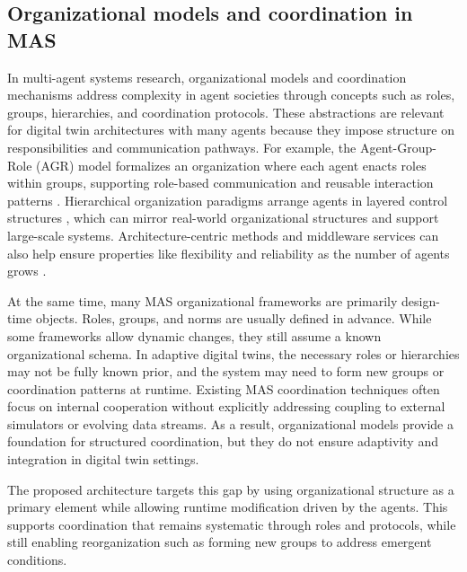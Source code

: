 \subsection{Organizational models and coordination in MAS}
In multi-agent systems research, organizational models and coordination mechanisms address complexity in agent societies through concepts such as roles, groups, hierarchies, and coordination protocols. These abstractions are relevant for digital twin architectures with many agents because they impose structure on responsibilities and communication pathways. For example, the Agent-Group-Role (AGR) model formalizes an organization where each agent enacts roles within groups, supporting role-based communication and reusable interaction patterns \cite{ferber2003organizational_view}. Hierarchical organization paradigms arrange agents in layered control structures \cite{horling2004survey_org_paradigms}, which can mirror real-world organizational structures and support large-scale systems. Architecture-centric methods and middleware services can also help ensure properties like flexibility and reliability as the number of agents grows \cite{weyns2010architecture}.

At the same time, many MAS organizational frameworks are primarily design-time objects. Roles, groups, and norms are usually defined in advance. While some frameworks allow dynamic changes, they still assume a known organizational schema. In adaptive digital twins, the necessary roles or hierarchies may not be fully known prior, and the system may need to form new groups or coordination patterns at runtime. Existing MAS coordination techniques often focus on internal cooperation without explicitly addressing coupling to external simulators or evolving data streams. As a result, organizational models provide a foundation for structured coordination, but they do not ensure adaptivity and integration in digital twin settings.

The proposed architecture targets this gap by using organizational structure as a primary element while allowing runtime modification driven by the agents. This supports coordination that remains systematic through roles and protocols, while still enabling reorganization such as forming new groups to address emergent conditions.
